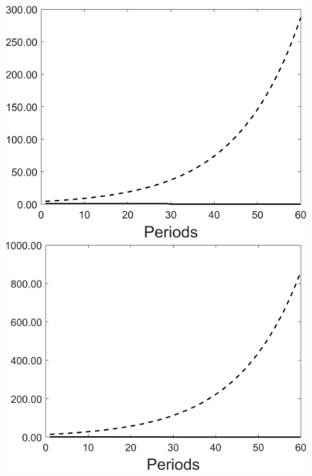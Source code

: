 \begin{figure}[h!!]
\begin{minipage}[]{0.32\textwidth}
	\end{minipage}
	\begin{minipage}[]{0.32\textwidth}
		\includegraphics[width=1\textwidth]{../codding_model/Own/figures/Rep_agent/staticRam_LF_separate_yd_periods59_eppsilon0.40_zeta1.40_Ad08_Ac04_thetac0.70_thetad0.56_HetGrowth1_tauul0.181_util0_withtarget1_lgd0.png}
	\end{minipage}
	\begin{minipage}[]{0.32\textwidth}
		\includegraphics[width=1\textwidth]{../codding_model/Own/figures/Rep_agent/staticRam_LF_separate_xd_periods59_eppsilon0.40_zeta1.40_Ad08_Ac04_thetac0.70_thetad0.56_HetGrowth1_tauul0.181_util0_withtarget1_lgd0.png}

\end{minipage}
\end{figure}
